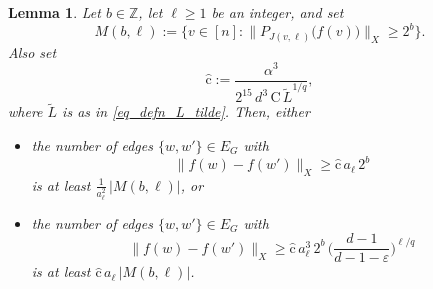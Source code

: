 \documentclass[11pt,leqno]{amsart}
\newtheorem{lemma}[theorem]{Lemma}
\theoremstyle{remark}
\theoremstyle{plain}
\newcommand{\Z}{\mathbb{Z}}
\begin{document}
\begin{lemma}\label{afokjnlfkjnsadfkjhsfb}
Let $b\in\Z$, let $\ell\geqslant 1$ be an integer, and set
$$ M(b,\ell):= \big\{v\in[n]\colon \big\|P_{J(v,\ell)}\big(f(v)\big)\big\|_X\geqslant 2^b\big\}. $$
Also set
\begin{equation} \label{eq-c-hat}
\hat{\mathrm{c}} := \frac{\alpha^3}{2^{15}\, d^3\, \mathrm{C}\, \tilde{L}^{1/q}},
\end{equation}
where $\tilde{L}$ is as in \eqref{eq_defn_L_tilde}. Then, either
\begin{itemize}
\item[(i)] the number of edges $\{w,w'\}\in E_G$ with
$$\|f(w)-f(w')\|_X\geqslant \hat{\mathrm{c}}\,a_\ell\,2^b$$
is at least $\frac{1}{a_\ell^2}\,|M(b,\ell)|$, or
\item[(ii)] the number of edges $\{w,w'\}\in E_G$ with
$$ \|f(w)-f(w')\|_X\geqslant \hat{\mathrm{c}}\,a_\ell^3\,2^b\,\bigg(\frac{d-1}{d-1-\varepsilon}\bigg)^{\ell/q} $$
is at least $\hat{\mathrm{c}}\,a_\ell\,|M(b,\ell)|$.
\end{itemize}
\end{lemma}
\end{document}
